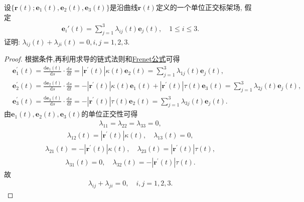 \documentclass[../../main.tex]{subfiles}%
\begin{document}
\begin{example}
设$\{\bm{r}(t); \bm{e}_1(t), \bm{e}_2(t), \bm{e}_3(t)\}$是沿曲线$\bm{r}(t)$定义的一个单位正交标架场, 假定
\begin{align*}
\bm{e}_i'(t) = \sum\limits_{j=1}^{3} \lambda_{ij}(t) \bm{e}_j(t),\quad 1 \leqslant i \leqslant 3.
\end{align*}
证明: $\lambda_{ij}(t) + \lambda_{ji}(t) = 0, i,j = 1,2,3.$
\end{example}
\begin{proof}
根据条件,再利用求导的链式法则和\hyperref[theorem:微分几何-Frenet公式]{Frenet公式}可得
\begin{align*}
&\bm{e}_{1}^{\prime}\left( t \right) =\frac{\mathrm{d}\bm{e}_1\left( t \right)}{\mathrm{d}s}\cdot \frac{\mathrm{d}s}{\mathrm{d}t}=\left| \bm{r}^\prime \left( t \right) \right|\kappa \left( t \right) \bm{e}_2\left( t \right) =\sum_{j=1}^3{\lambda _{1j}\left( t \right) \bm{e}_j\left( t \right)},
\\
&\bm{e}_{2}^{\prime}\left( t \right) =\frac{\mathrm{d}\bm{e}_2\left( t \right)}{\mathrm{d}s}\cdot \frac{\mathrm{d}s}{\mathrm{d}t}=-\left| \bm{r}^\prime \left( t \right) \right|\kappa \left( t \right) \bm{e}_1\left( t \right) +\left| \bm{r}^\prime \left( t \right) \right|\tau \left( t \right) \bm{e}_3\left( t \right) =\sum_{j=1}^3{\lambda _{2j}\left( t \right) \bm{e}_j\left( t \right)},
\\
&\bm{e}_{3}^{\prime}\left( t \right) =\frac{\mathrm{d}\bm{e}_3\left( t \right)}{\mathrm{d}s}\cdot \frac{\mathrm{d}s}{\mathrm{d}t}=-\left| \bm{r}^\prime \left( t \right) \right|\tau \left( t \right) \bm{e}_2\left( t \right) =\sum_{j=1}^3{\lambda _{3j}\left( t \right) \bm{e}_j\left( t \right)}.
\end{align*}
由$\bm{e}_1\left( t \right) ,\bm{e}_2\left( t \right) ,\bm{e}_3\left( t \right)$的单位正交性可得
\begin{align*}
\lambda_{11}=\lambda_{22}=\lambda_{33}=0,
\end{align*}
\begin{align*}
\lambda _{12}\left( t \right) =\left| \bm{r}^\prime \left( t \right) \right|\kappa \left( t \right) ,\quad \lambda _{13}\left( t \right) =0,
\end{align*}
\begin{align*}
\lambda _{21}\left( t \right) =-\left| \bm{r}^\prime \left( t \right) \right|\kappa \left( t \right) ,\quad \lambda _{23}\left( t \right) =\left| \bm{r}^\prime \left( t \right) \right|\tau \left( t \right) ,
\end{align*}
\begin{align*}
\lambda _{31}\left( t \right) =0,\quad \lambda _{32}\left( t \right) =-\left| \bm{r}^\prime \left( t \right) \right|\tau \left( t \right) .
\end{align*}
故
\begin{align*}
\lambda _{ij}+\lambda _{ji}=0,\quad i,j=1,2,3.
\end{align*}
\end{proof}
\end{document}
